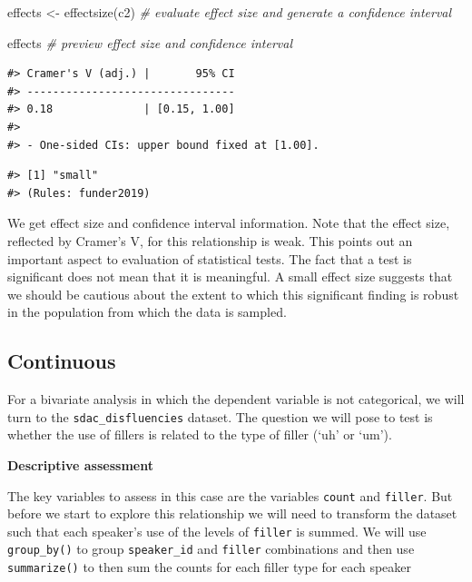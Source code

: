 \documentclass[
  letterpaper,
]{latex/krantz}
\newenvironment{Shaded}{\begin{snugshade}}{\end{snugshade}}
\newcommand{\CommentTok}[1]{\textcolor[rgb]{0.00,0.00,0.00}{\textit{#1}}}
\newcommand{\FunctionTok}[1]{\textcolor[rgb]{0.00,0.00,0.00}{#1}}
\newcommand{\NormalTok}[1]{\textcolor[rgb]{0.00,0.00,0.00}{#1}}
\newcommand{\OtherTok}[1]{\textcolor[rgb]{0.00,0.00,0.00}{#1}}
\newcommand{\SpecialCharTok}[1]{\textcolor[rgb]{0.00,0.00,0.00}{#1}}
\begin{document}
\begin{Shaded}
\begin{Highlighting}[]
\NormalTok{effects }\OtherTok{\textless{}{-}} \FunctionTok{effectsize}\NormalTok{(c2) }\CommentTok{\# evaluate effect size and generate a confidence interval}

\NormalTok{effects }\CommentTok{\# preview effect size and confidence interval}
\end{Highlighting}
\end{Shaded}

\begin{verbatim}
#> Cramer's V (adj.) |       95% CI
#> --------------------------------
#> 0.18              | [0.15, 1.00]
#> 
#> - One-sided CIs: upper bound fixed at [1.00].
\end{verbatim}

\begin{Shaded}
\end{Shaded}

\begin{verbatim}
#> [1] "small"
#> (Rules: funder2019)
\end{verbatim}

We get effect size and confidence interval information. Note that the
effect size, reflected by Cramer's V, for this relationship is weak.
This points out an important aspect to evaluation of statistical tests.
The fact that a test is significant does not mean that it is meaningful.
A small effect size suggests that we should be cautious about the extent
to which this significant finding is robust in the population from which
the data is sampled.

\hypertarget{continuous-1}{%
\subsection{Continuous}\label{continuous-1}}

For a bivariate analysis in which the dependent variable is not
categorical, we will turn to the \texttt{sdac\_disfluencies} dataset.
The question we will pose to test is whether the use of fillers is
related to the type of filler (`uh' or `um').

\textbf{Descriptive assessment}

The key variables to assess in this case are the variables
\texttt{count} and \texttt{filler}. But before we start to explore this
relationship we will need to transform the dataset such that each
speaker's use of the levels of \texttt{filler} is summed. We will use
\texttt{group\_by()} to group \texttt{speaker\_id} and \texttt{filler}
combinations and then use \texttt{summarize()} to then sum the counts
for each filler type for each speaker
\end{document}
